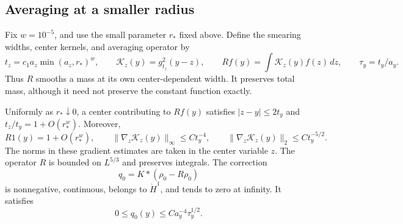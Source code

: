 \subsection{Averaging at a smaller radius}

Fix $w=10^{-5}$, and use the small parameter $r_*$ fixed above.
Define the smearing widths, center kernels,
and averaging operator by
\begin{equation}\label{m:eq:master-kernel}
 t_z=c_1a_z\min(a_z,r_*)^w,\qquad
 \mathcal K_z(y)=g_{t_z}^2(y-z),\qquad
 Rf(y)=\int\mathcal K_z(y)f(z)\,dz,
 \qquad \tau_y=t_y/a_y.
\end{equation}
Thus $R$ smooths a mass at its own center-dependent width.  It preserves
total mass, although it need not preserve the constant function exactly.

\begin{lemma}\label{m:lem:barrier-kernel}
Uniformly as $r_*\downarrow0$, a center contributing to $Rf(y)$ satisfies
$|z-y|\le2t_y$ and $t_z/t_y=1+O(r_*^w)$.  Moreover,
\begin{equation}\label{m:eq:master-kernel-bounds}
 R1(y)=1+O(r_*^w),\qquad
 \|\nabla_z\mathcal K_z(y)\|_\infty\le Ct_y^{-4},\qquad
 \|\nabla_z\mathcal K_z(y)\|_2\le Ct_y^{-5/2}.
\end{equation}
The norms in these gradient estimates are taken in the center variable $z$.
The operator $R$ is bounded on $L^{5/3}$ and preserves integrals.
The correction
\begin{equation}\label{m:eq:potential-correction}
 q_0=K*(\rho_0-R\rho_0)
\end{equation}
is nonnegative, continuous, belongs to $\dot H^1$, and tends to zero at
infinity.  It satisfies
\begin{equation}\label{m:eq:potential-correction-bound}
 0\le q_0(y)\le Ca_y^{-4}\tau_y^{1/2}.
\end{equation}
\end{lemma}

